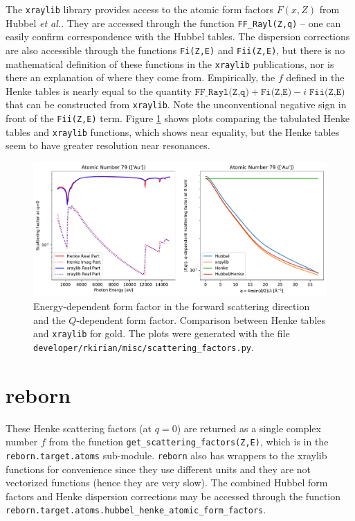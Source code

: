 \documentclass[11pt]{article}
\begin{document}
The \texttt{xraylib} library\cite{schoonjansXraylibLibraryXray2011,brunettiLibraryXrayMatter2004} provides access to the
atomic form factors  $F(x,Z)$  from Hubbel {\itshape et al.}\cite{hubbellAtomicFormFactors1975}.  They are accessed
through the function \texttt{FF\_Rayl(Z,q)} -- one can easily confirm correspondence with the Hubbel tables.  The
dispersion corrections are also accessible through the functions \texttt{Fi(Z,E)} and \texttt{Fii(Z,E)}, but there is
no mathematical definition of these functions in the \texttt{xraylib} publications, nor is there an explanation of where
they come from.   Empirically, the $f$ defined in the Henke tables is nearly equal to the quantity
$\texttt{FF\_Rayl(Z,q)} + \texttt{Fi(Z,E)} - i\; \texttt{Fii(Z,E)}$ that can be constructed from \texttt{xraylib}.  Note
the unconventional negative sign in front of the \texttt{Fii(Z,E)} term.  Figure \ref{fig:forms} shows plots comparing
the tabulated Henke tables and \texttt{xraylib} functions, which shows near equality, but the Henke tables seem to have
greater resolution near resonances.
\begin{figure}[htbp]
   \centering
   \includegraphics[width=\textwidth]{figures/formfactor_79.pdf} 
   \caption{Energy-dependent form factor in the forward scattering direction and the $Q$-dependent form factor.
   Comparison between Henke tables and \texttt{xraylib} for gold.  The plots were generated with the file
   \texttt{developer/rkirian/misc/scattering\_factors.py}.}
   \label{fig:forms}
\end{figure} 


\section{reborn}

These Henke scattering factors (at $q=0$) are returned as a single complex number $f$ from the function
\texttt{get\_scattering\_factors(Z,E)}, which is in the \texttt{reborn.target.atoms} sub-module.
\texttt{reborn} also has wrappers to the xraylib functions for convenience since they use different
units and they are not vectorized functions (hence they are very slow).  The combined Hubbel form
factors and Henke dispersion corrections may be accessed through the function
\texttt{reborn.target.atoms.hubbel\_henke\_atomic\_form\_factors}.
\end{document}
